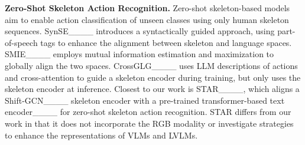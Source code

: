 \textbf{Zero-Shot Skeleton Action Recognition.}
Zero-shot skeleton-based models aim to enable action classification of unseen classes using only human skeleton sequences. SynSE____ introduces a syntactically guided approach, using part-of-speech tags to enhance the alignment between skeleton and language spaces. SMIE____ employs mutual information estimation and maximization to globally align the two spaces. CrossGLG____ uses LLM descriptions of actions and cross-attention to guide a skeleton encoder during training, but only uses the skeleton encoder at inference. Closest to our work is STAR____, which aligns a Shift-GCN____ skeleton encoder with a pre-trained transformer-based text encoder____ for zero-shot skeleton action recognition. STAR differs from our work in that it does not incorporate the RGB modality or investigate strategies to enhance the representations of VLMs and LVLMs.


